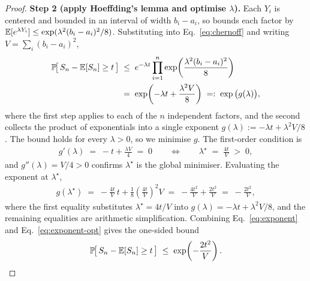 \begin{proof}
\smallskip\noindent\textbf{Step 2 (apply Hoeffding's lemma and optimise $\lambda$).}
Each $Y_i$ is centered and bounded in an interval of width $b_i - a_i$, so
 bounds each factor by
$\mathbb{E}[e^{\lambda Y_i}] \le \exp(\lambda^2 (b_i - a_i)^2 / 8)$. Substituting into
Eq.~\eqref{eq:chernoff} and writing $V = \sum_i (b_i - a_i)^2$,
\begin{align}
\mathbb{P}\!\big[\, S_n - \mathbb{E}[S_n] \ge t \,\big]
&\;\le\; e^{-\lambda t} \prod_{i=1}^n \exp\!\left( \frac{\lambda^2 (b_i - a_i)^2}{8} \right) \notag \\
&\;=\; \exp\!\left( -\lambda t + \frac{\lambda^2 V}{8} \right)
   \;=:\; \exp\big( g(\lambda) \big), \label{eq:exponent}
\end{align}
where the first step applies  to each of the $n$ independent
factors, and the second collects the product of exponentials into a single
exponent $g(\lambda) := -\lambda t + \lambda^2 V / 8$. The bound holds for every
$\lambda > 0$, so we minimise $g$. The first-order condition is
\begin{align}
g'(\lambda) \;=\; -t + \frac{\lambda V}{4} \;=\; 0
\qquad\Longleftrightarrow\qquad
\lambda^\star \;=\; \frac{4 t}{V} \;>\; 0, \label{eq:foc}
\end{align}
and $g''(\lambda) = V/4 > 0$ confirms $\lambda^\star$ is the global minimiser.
Evaluating the exponent at $\lambda^\star$,
\begin{align}
g(\lambda^\star)
\;=\; -\frac{4t}{V}\, t + \frac{1}{8}\left( \frac{4t}{V} \right)^{\!2} V
\;=\; -\frac{4 t^2}{V} + \frac{2 t^2}{V}
\;=\; -\frac{2 t^2}{V}, \label{eq:exponent-opt}
\end{align}
where the first equality substitutes $\lambda^\star = 4t/V$ into
$g(\lambda) = -\lambda t + \lambda^2 V/8$, and the remaining equalities are
arithmetic simplification. Combining Eq.~\eqref{eq:exponent}
and Eq.~\eqref{eq:exponent-opt} gives the one-sided bound
\begin{align}
\mathbb{P}\!\big[\, S_n - \mathbb{E}[S_n] \ge t \,\big]
\;\le\; \exp\!\left( - \frac{2 t^2}{V} \right). \label{eq:one-sided}
\end{align}


\end{proof}

